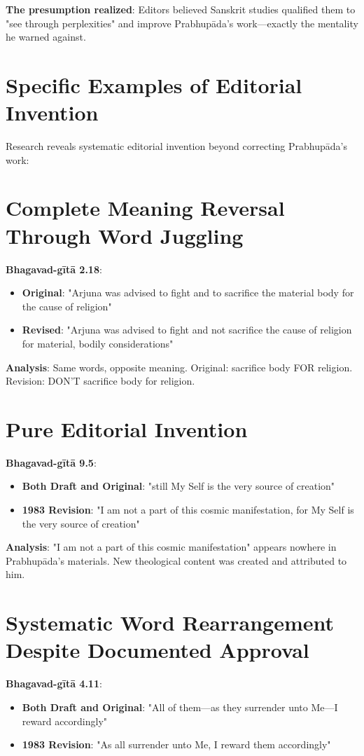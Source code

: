 \documentclass[11pt,twoside]{book}
\begin{document}
\textbf{\textbf{The presumption realized}}: Editors believed Sanskrit studies qualified them to "see through perplexities" and improve Prabhupāda's work—exactly the mentality he warned against.
\section*{Specific Examples of Editorial Invention}
\label{sec:org2ace972}

Research reveals systematic editorial invention beyond correcting Prabhupāda's work:
\section*{Complete Meaning Reversal Through Word Juggling}
\label{sec:orgd66fce5}
\textbf{\textbf{Bhagavad-gītā 2.18}}:
\begin{itemize}
\item \textbf{\textbf{Original}}: "Arjuna was advised to fight and to sacrifice the material body for the cause of religion"
\item \textbf{\textbf{Revised}}: "Arjuna was advised to fight and not sacrifice the cause of religion for material, bodily considerations"
\end{itemize}

\textbf{\textbf{Analysis}}: Same words, opposite meaning. Original: sacrifice body FOR religion. Revision: DON'T sacrifice body for religion.
\section*{Pure Editorial Invention}
\label{sec:orgd797e6a}
\textbf{\textbf{Bhagavad-gītā 9.5}}:
\begin{itemize}
\item \textbf{\textbf{Both Draft and Original}}: "still My Self is the very source of creation"
\item \textbf{\textbf{1983 Revision}}: "I am not a part of this cosmic manifestation, for My Self is the very source of creation"
\end{itemize}

\textbf{\textbf{Analysis}}: "I am not a part of this cosmic manifestation" appears nowhere in Prabhupāda's materials. New theological content was created and attributed to him.
\section*{Systematic Word Rearrangement Despite Documented Approval}
\label{sec:orgcde1da4}
\textbf{\textbf{Bhagavad-gītā 4.11}}:
\begin{itemize}
\item \textbf{\textbf{Both Draft and Original}}: "All of them—as they surrender unto Me—I reward accordingly"
\item \textbf{\textbf{1983 Revision}}: "As all surrender unto Me, I reward them accordingly"
\end{itemize}
\end{document}
